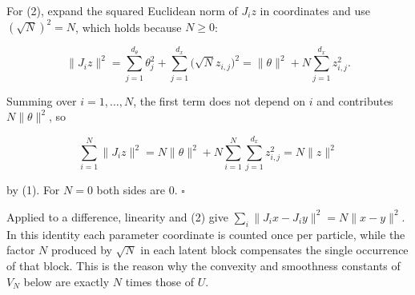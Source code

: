 \documentclass[11pt,a4paper]{report}
\begin{document}
For (2), expand the squared Euclidean norm of \(J_iz\) in coordinates and use \((\sqrt N)^2=N\), which holds because \(N\ge0\):


\[\|J_iz\|^2=\sum_{j=1}^{d_\theta}\theta_j^2+\sum_{j=1}^{d_x}\bigl(\sqrt N z_{i,j}\bigr)^2=\|\theta\|^2+N\sum_{j=1}^{d_x}z_{i,j}^2 .\]


Summing over \(i=1,\dots,N\), the first term does not depend on \(i\) and contributes \(N\|\theta\|^2\), so


\[\sum_{i=1}^N\|J_iz\|^2=N\|\theta\|^2+N\sum_{i=1}^N\sum_{j=1}^{d_x}z_{i,j}^2=N\|z\|^2\]


by (1). For \(N=0\) both sides are \(0\). \(\square\)




Applied to a difference, linearity and (2) give \(\sum_i\|J_ix-J_iy\|^2=N\|x-y\|^2\). In this identity each parameter coordinate is counted once per particle, while the factor \(N\) produced by \(\sqrt N\) in each latent block compensates the single occurrence of that block. This is the reason why the convexity and smoothness constants of \(V_N\) below are exactly \(N\) times those of \(U\).
\end{document}
